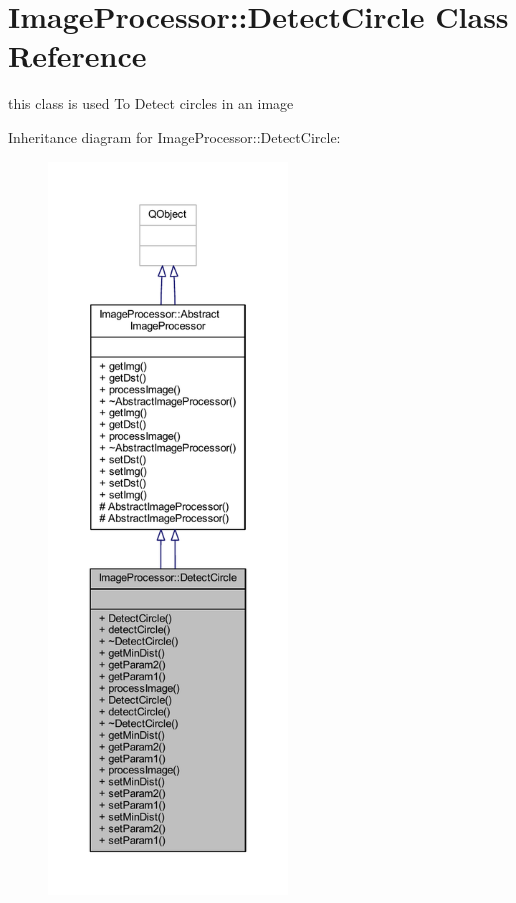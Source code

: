 \hypertarget{class_image_processor_1_1_detect_circle}{}\section{Image\+Processor\+:\+:Detect\+Circle Class Reference}
\label{class_image_processor_1_1_detect_circle}


this class is used To Detect circles in an image  




Inheritance diagram for Image\+Processor\+:\+:Detect\+Circle\+:\nopagebreak
\begin{figure}[H]
\begin{center}
\leavevmode
\includegraphics[height=550pt]{de/dd4/class_image_processor_1_1_detect_circle__inherit__graph}
\end{center}
\end{figure}



